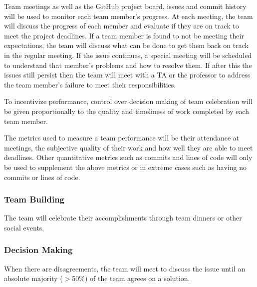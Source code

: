 \documentclass{article}
\begin{document}

\noindent Team meetings as well as the GitHub project board, issues and commit history will be used to monitor each team member's progress.
At each meeting, the team will discuss the progress of each member and evaluate if they are on track to meet the project deadlines.
If a team member is found to not be meeting their expectations, the team will discuss what can be done to get them back on track in the regular meeting.
If the issue continues, a special meeting will be scheduled to understand that member's problems and how to resolve them.
If after this the issues still persist then the team will meet with a TA or the professor to address the team member's failure to meet their responsibilities.

\noindent To incentivize performance, control over decision making of team celebration will be given proportionally to the quality and timeliness of work completed by each team member.

\noindent The metrics used to measure a team performance will be their attendance at meetings, the subjective quality of their work and how well they are able to meet deadlines.
Other quantitative metrics such as commits and lines of code will only be used to supplement the above metrics or in extreme cases such as having no commits or lines of code.
\subsubsection*{Team Building}


\noindent The team will celebrate their accomplishments through team dinners or other social events.

\subsubsection*{Decision Making} 


\noindent When there are disagreements, the team will meet to discuss the issue until an absolute majority ($>$50\%) of the team agrees on a solution.
\end{document}
